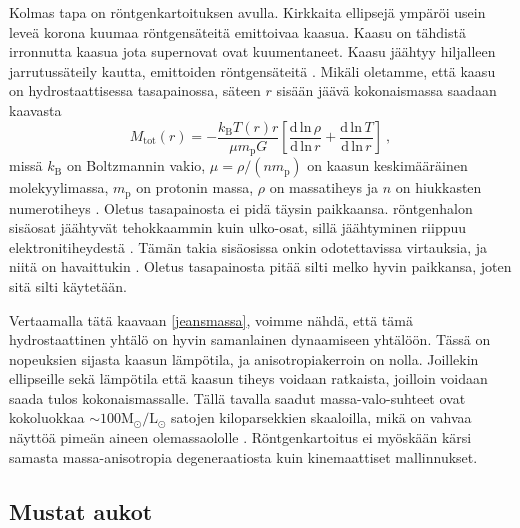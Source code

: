 \documentclass[12pt,a4paper]{article}
\begin{document}
Kolmas tapa on röntgenkartoituksen avulla. Kirkkaita ellipsejä ympäröi usein leveä korona kuumaa röntgensäteitä emittoivaa kaasua. Kaasu on tähdistä irronnutta kaasua jota supernovat ovat kuumentaneet. Kaasu jäähtyy hiljalleen jarrutussäteily kautta, emittoiden röntgensäteitä \citep{galdyn}. Mikäli oletamme, että kaasu on hydrostaattisessa tasapainossa, säteen $r$ sisään jäävä kokonaismassa saadaan kaavasta 
\begin{equation}
M_\mathrm{tot}(r) = - \frac{k_\mathrm{B} T(r) r}{\mu m_\mathrm{p} G} \left[ \frac{\mathrm{d \, ln} \, \rho}{\mathrm{d \, ln} \, r} + \frac{\mathrm{d \, ln} \, T}{\mathrm{d \, ln} \, r} \right] \ ,
\end{equation}
missä $k_\mathrm{B}$ on Boltzmannin vakio, $\mu = \rho /(n m_\mathrm{p})$ on kaasun keskimääräinen molekyylimassa, $m_\mathrm{p}$ on protonin massa, $\rho$ on massatiheys ja $n$ on hiukkasten numerotiheys \citep{galform}. Oletus tasapainosta ei pidä täysin paikkaansa. röntgenhalon sisäosat jäähtyvät tehokkaammin kuin ulko-osat, sillä jäähtyminen riippuu elektronitiheydestä \citep{galdyn}. Tämän takia sisäosissa onkin odotettavissa virtauksia, ja niitä on havaittukin \citep{musho:1994}. Oletus tasapainosta pitää silti melko hyvin paikkansa, joten sitä silti käytetään.

Vertaamalla tätä kaavaan \ref{jeansmassa}, voimme nähdä, että tämä hydrostaattinen yhtälö on hyvin samanlainen dynaamiseen yhtälöön. Tässä on nopeuksien sijasta kaasun lämpötila, ja anisotropiakerroin on nolla. Joillekin ellipseille sekä lämpötila että kaasun tiheys voidaan ratkaista, joilloin voidaan saada tulos kokonaismassalle.  Tällä tavalla saadut massa-valo-suhteet ovat kokoluokkaa $\sim 100 \mathrm{M_\odot / L_\odot}$ satojen kiloparsekkien skaaloilla, mikä on vahvaa näyttöä pimeän aineen olemassaololle \citep{forman:1985, musho:1994}. Röntgenkartoitus ei myöskään kärsi samasta massa-anisotropia degeneraatiosta kuin kinemaattiset mallinnukset.


\subsection{Mustat aukot}
\end{document}
